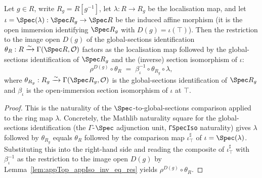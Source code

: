 \begin{lemma}
  \label{lem:key_morph}
  Let \(g \in R\), write \(R_g = R[g^{-1}]\), let \(\lambda : R \to R_g\) be the localisation map, and let
  \(\iota = \Spec(\lambda) : \Spec R_g \to \Spec R\) be the induced affine morphism (it is the open
  immersion identifying \(\Spec R_g\) with \(D(g) = \iota(\top)\)). Then the restriction to the image
  open \(D(g)\) of the global-sections identification
  \(\theta_R : R \xrightarrow{\sim} \Gamma(\Spec R, \mathcal{O})\) factors as the localisation map
  followed by the global-sections identification of \(\Spec R_g\) and the (inverse) section isomorphism
  of \(\iota\):
  \[
    \rho^{D(g)} \circ \theta_R
    \;=\;
    \beta_\iota^{-1} \circ \theta_{R_g} \circ \lambda,
  \]
  where \(\theta_{R_g} : R_g \xrightarrow{\sim} \Gamma(\Spec R_g, \mathcal{O})\) is the global-sections
  identification of \(\Spec R_g\) and \(\beta_\iota\) is the open-immersion section isomorphism of
  \(\iota\) at \(\top\).
\end{lemma}
\begin{proof}
  \leanok
  This is the naturality of the \(\Spec\)-to-global-sections comparison applied to the ring map
  \(\lambda\). Concretely, the Mathlib naturality square for the global-sections identification (the
  \(\Gamma\)-\(\Spec\) adjunction unit, \texttt{ΓSpecIso} naturality) gives
  \(\lambda \) followed by \(\theta_{R_g}\) equals \(\theta_R\) followed by the comparison map
  \(\iota^{\sharp}_{\top}\) of \(\iota = \Spec(\lambda)\). Substituting this into the right-hand side and
  reading the composite of \(\iota^{\sharp}_{\top}\) with \(\beta_\iota^{-1}\) as the restriction to the
  image open \(D(g)\) by Lemma~\ref{lem:appTop_appIso_inv_eq_res} yields \(\rho^{D(g)} \circ \theta_R\).
\end{proof}

